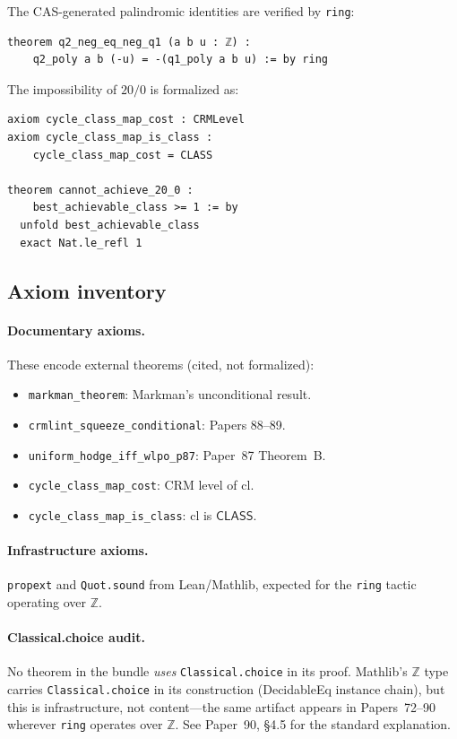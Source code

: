 \documentclass[11pt]{article}
\theoremstyle{plain}
\theoremstyle{definition}
\theoremstyle{remark}
\newcommand{\ZZ}{\mathbb{Z}}
\newcommand{\CLASS}{\mathsf{CLASS}}
\begin{document}
\noindent
The CAS-generated palindromic identities are verified by \texttt{ring}:

\begin{lstlisting}[style=leanstyle,caption={Isomorphism certificate (from CycleData.lean)}]
theorem q2_neg_eq_neg_q1 (a b u : ℤ) :
    q2_poly a b (-u) = -(q1_poly a b u) := by ring
\end{lstlisting}

\noindent
The impossibility of $20/0$ is formalized as:

\begin{lstlisting}[style=leanstyle,caption={Theorem D: 20/0 impossibility (from CycleClassMap.lean)}]
axiom cycle_class_map_cost : CRMLevel
axiom cycle_class_map_is_class :
    cycle_class_map_cost = CLASS

theorem cannot_achieve_20_0 :
    best_achievable_class >= 1 := by
  unfold best_achievable_class
  exact Nat.le_refl 1
\end{lstlisting}

\subsection{Axiom inventory}

\paragraph{Documentary axioms.}
These encode external theorems (cited, not formalized):
\begin{itemize}[nosep]
\item \texttt{markman\_theorem}: Markman's unconditional result.
\item \texttt{crmlint\_squeeze\_conditional}: Papers 88--89.
\item \texttt{uniform\_hodge\_iff\_wlpo\_p87}: Paper~87 Theorem~B.
\item \texttt{cycle\_class\_map\_cost}: CRM level of $\mathrm{cl}$.
\item \texttt{cycle\_class\_map\_is\_class}: $\mathrm{cl}$ is $\CLASS$.
\end{itemize}

\paragraph{Infrastructure axioms.}
\texttt{propext} and \texttt{Quot.sound} from Lean/Mathlib, expected
for the \texttt{ring} tactic operating over $\ZZ$.

\paragraph{Classical.choice audit.}
No theorem in the bundle \emph{uses} \texttt{Classical.choice} in its
proof.  Mathlib's $\ZZ$ type carries \texttt{Classical.choice} in its
construction (DecidableEq instance chain), but this is infrastructure,
not content---the same artifact appears in Papers~72--90 wherever
\texttt{ring} operates over $\ZZ$.  See Paper~90, \S4.5 for the
standard explanation.
\end{document}
